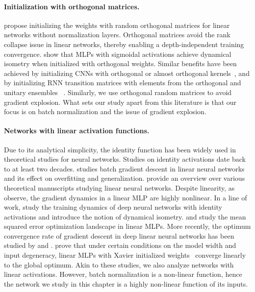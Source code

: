 \paragraph{Initialization with orthogonal matrices.}
\citet{saxe2013exact} propose initializing the weights with random orthogonal matrices for linear networks without normalization layers. Orthogonal matrices avoid the rank collapse issue in linear networks, thereby enabling a depth-independent training convergence. \citet{pennington2017resurrecting} show that MLPs with sigmoidal activations achieve dynamical isometry when initialized with orthogonal weights. Similar benefits have been achieved by initializing CNNs with orthogonal or almost orthogonal kernels~\citep{xiao2018dynamical,mishkin2015all}, and by initializing RNN transition matrices with elements from the orthogonal and unitary ensembles ~\citep{arjovsky2016unitary,le2015simple,henaff2016recurrent}. Similarly, we use orthogonal random matrices to avoid gradient explosion. What sets our study apart from this literature is that our focus is on batch normalization and the issue of gradient explosion.

\paragraph{Networks with linear activation functions.}
Due to its analytical simplicity, the identity function has been widely used in theoretical studies for neural networks. Studies on identity activations date back to at least two decades. \citet{fukumizu1998effect} studies batch gradient descent in linear neural networks and its effect on overfitting and generalization. \citet{baldi1995learning} provide an overview over various theoretical manuscripts studying linear neural networks. Despite linearity, as \citet{saxe2013exact, saxe2013learning} observe, the gradient dynamics in a linear MLP are highly nonlinear. In a line of work,  \citet{saxe2013learning,saxe2013exact, saxe2019mathematical} study the training dynamics of deep neural networks with identity activations and introduce the notion of dynamical isometry. \citet{baldi1989neural} and \citet{yun2017global} study the mean squared error optimization landscape in linear MLPs. More recently, the optimum convergence rate of gradient descent in deep linear neural networks has been studied by \citet{arora2018convergence} and \citet{shamir2019exponential}. \citet{du2019width} prove that under certain conditions on the model width and input degeneracy, linear MLPs with Xavier initialized weights~\citep{glorot2010understanding} converge linearly to the global optimum. Akin to these studies, we also analyze networks with linear activations. However, batch normalization is a non-linear function, hence the network we study in this chapter is a highly non-linear function of its inputs.

